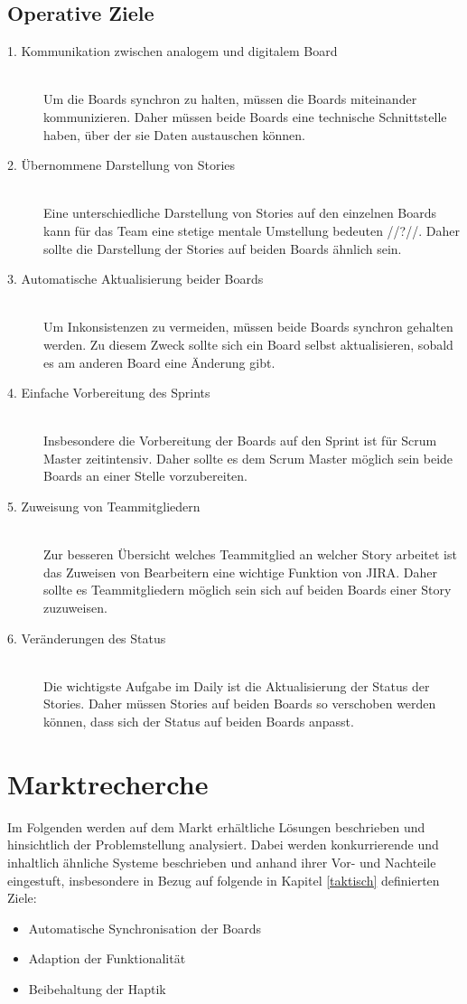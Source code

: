 \documentclass[12pt,titlepage]{scrartcl}
\begin{document}
		\subsection{Operative Ziele} \label{operativeZiele}
		\begin{description}
 			\item[1. Kommunikation zwischen analogem und digitalem Board] \hfill \\
 			Um die Boards synchron zu halten, müssen die Boards miteinander kommunizieren. Daher müssen beide Boards eine technische Schnittstelle haben, über der sie Daten austauschen können. 
 			\item[2. Übernommene Darstellung von Stories] \hfill \\
 			Eine unterschiedliche Darstellung von Stories auf den einzelnen Boards kann für das Team eine stetige mentale Umstellung bedeuten //?//. Daher sollte die Darstellung der Stories auf beiden Boards ähnlich sein.
 			\item[3. Automatische Aktualisierung beider Boards] \hfill \\
 			Um Inkonsistenzen zu vermeiden, müssen beide Boards synchron gehalten werden. Zu diesem Zweck sollte sich ein Board selbst aktualisieren, sobald es am anderen Board eine Änderung gibt.
 			\item[4. Einfache Vorbereitung des Sprints] \hfill \\
 			Insbesondere die Vorbereitung der Boards auf den Sprint ist für Scrum Master zeitintensiv. Daher sollte es dem Scrum Master möglich sein beide Boards an einer Stelle vorzubereiten.
 			\item[5. Zuweisung von Teammitgliedern] \hfill \\
 			Zur besseren Übersicht welches Teammitglied an welcher Story arbeitet ist das Zuweisen von Bearbeitern eine wichtige Funktion von JIRA. Daher sollte es Teammitgliedern möglich sein sich auf beiden Boards einer Story zuzuweisen.
 			\item[6. Veränderungen des Status] \hfill \\
 			Die wichtigste Aufgabe im Daily ist die Aktualisierung der Status der Stories. Daher müssen Stories auf beiden Boards so verschoben werden können, dass sich der Status auf beiden Boards anpasst.
		\end{description}
	\newpage	
	\section{Marktrecherche}
	Im Folgenden werden auf dem Markt erhältliche Lösungen beschrieben und hinsichtlich der Problemstellung analysiert. Dabei werden konkurrierende und inhaltlich ähnliche Systeme beschrieben und anhand ihrer Vor- und Nachteile eingestuft, insbesondere in Bezug auf folgende in Kapitel \ref{taktisch} definierten Ziele:
	\begin{itemize} 
		\item Automatische Synchronisation der Boards 
		\item Adaption der Funktionalität
		\item Beibehaltung der Haptik 
	\end{itemize}
\end{document}
